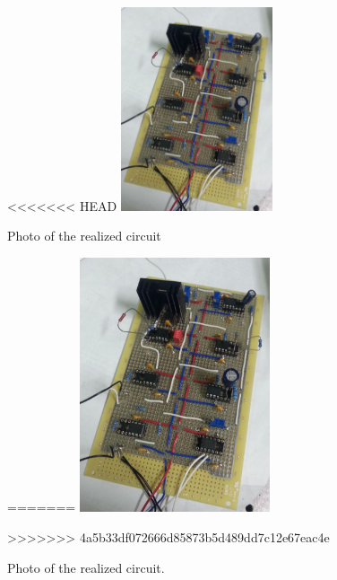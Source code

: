 \documentclass[a4paper,10pt]{article}
\begin{document}
\begin{figure}[H]
\centering
<<<<<<< HEAD
\includegraphics[width=0.4\textwidth]{photocircuit}
\caption{Photo of the realized circuit}\label{photocircuit}
=======
\includegraphics[width=0.5\textwidth]{photocircuit}
\caption{Photo of the realized circuit.}\label{photocircuit}
>>>>>>> 4a5b33df072666d85873b5d489dd7c12e67eac4e
\end{figure}
\end{document}
